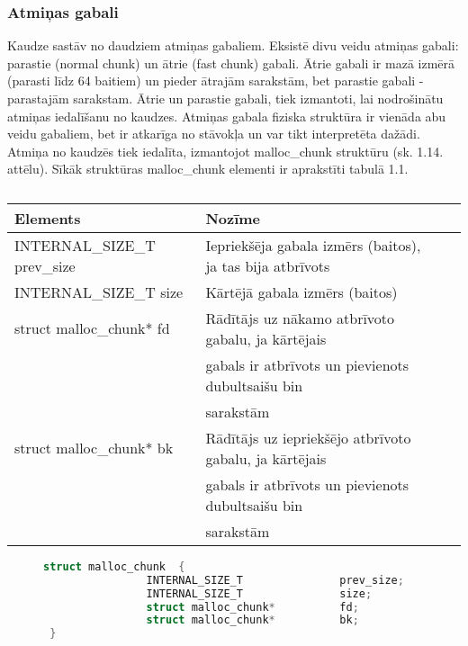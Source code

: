 \subsubsection{Atmiņas gabali}
\label{subsec:atminas_gabali}

Kaudze sastāv no daudziem atmiņas gabaliem.
Eksistē divu veidu atmiņas gabali: parastie (normal chunk) un ātrie (fast chunk) gabali. 
Ātrie gabali ir mazā izmērā (parasti līdz 64 baitiem) un pieder ātrajām sarakstām, bet parastie gabali - parastajām sarakstam. 
Ātrie un parastie gabali, tiek izmantoti, lai nodrošinātu atmiņas iedalīšanu no kaudzes.
Atmiņas gabala fiziska struktūra ir vienāda abu veidu gabaliem, bet ir atkarīga no stāvokļa un var tikt interpretēta dažādi.
Atmiņa no kaudzēs tiek iedalīta, izmantojot malloc\_chunk struktūru (sk. 1.14. attēlu). 
Sīkāk struktūras malloc\_chunk elementi ir aprakstīti tabulā 1.1.

\begin{table}[H]
\caption{\textbf{\fontsize{11}{12}\selectfont {\\ Atmiņās gabalu struktūras elementu apraksts}}} 
\label{table:kysymys}
\centering
	\begin{tabular}{|l|l|r|p{5cm}|}
	  \hline
	Elements & Nozīme \\
	\hline
	  INTERNAL\_SIZE\_T               prev\_size & Iepriekšēja gabala izmērs (baitos), ja tas bija atbrīvots\\
      \hline
      INTERNAL\_SIZE\_T               size & Kārtējā gabala izmērs (baitos) \\
      \hline
      struct malloc\_chunk*          fd & Rādītājs uz nākamo atbrīvoto gabalu, ja kārtējais  \\
                                                     & gabals ir atbrīvots un pievienots dubultsaišu bin \\
                                                     & sarakstām\\
      \hline
      struct malloc\_chunk*          bk & Rādītājs uz iepriekšējo atbrīvoto gabalu, ja kārtējais  \\
                                                     & gabals ir atbrīvots un pievienots dubultsaišu bin \\
                                                     & sarakstām\\
    \hline
	\end{tabular}
\end{table}
\begin{figure}[h]
\begin{lstlisting}[language=C++]
struct malloc_chunk  {
                INTERNAL_SIZE_T               prev_size;
                INTERNAL_SIZE_T               size;
                struct malloc_chunk*          fd;
                struct malloc_chunk*          bk;
 }
\end{lstlisting}
\caption{\textbf{\fontsize{11}{12}\selectfont {Atmiņas gabala struktūra}}}
\end{figure}

